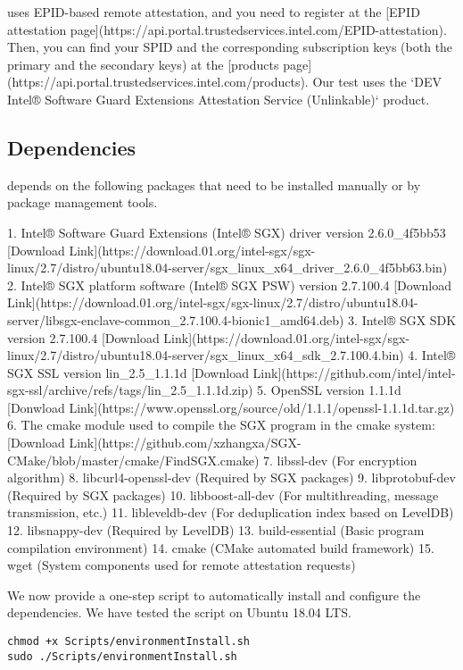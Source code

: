 \sysnameS uses EPID-based remote attestation, and you need to register at the [EPID attestation page](https://api.portal.trustedservices.intel.com/EPID-attestation). Then, you can find your SPID and the corresponding subscription keys (both the primary and the secondary keys) at the [products page](https://api.portal.trustedservices.intel.com/products). Our test uses the `DEV Intel® Software Guard Extensions Attestation Service (Unlinkable)` product.


\subsection{Dependencies}

\sysnameS depends on the following packages that  need to be installed manually or by package management tools.

1. Intel® Software Guard Extensions (Intel® SGX) driver version 2.6.0\_4f5bb53 [Download Link](https://download.01.org/intel-sgx/sgx-linux/2.7/distro/ubuntu18.04-server/sgx\_linux\_x64\_driver\_2.6.0\_4f5bb63.bin)
2. Intel® SGX platform software (Intel® SGX PSW) version 2.7.100.4 [Download Link](https://download.01.org/intel-sgx/sgx-linux/2.7/distro/ubuntu18.04-server/libsgx-enclave-common\_2.7.100.4-bionic1\_amd64.deb)
3. Intel® SGX SDK version 2.7.100.4 [Download Link](https://download.01.org/intel-sgx/sgx-linux/2.7/distro/ubuntu18.04-server/sgx\_linux\_x64\_sdk\_2.7.100.4.bin)
4. Intel® SGX SSL version lin\_2.5\_1.1.1d [Download Link](https://github.com/intel/intel-sgx-ssl/archive/refs/tags/lin\_2.5\_1.1.1d.zip)
5. OpenSSL version 1.1.1d [Donwload Link](https://www.openssl.org/source/old/1.1.1/openssl-1.1.1d.tar.gz)
6. The cmake module used to compile the SGX program in the cmake system: [Download Link](https://github.com/xzhangxa/SGX-CMake/blob/master/cmake/FindSGX.cmake)
7. libssl-dev (For \sysnameS encryption algorithm)
8. libcurl4-openssl-dev (Required by SGX packages)
9. libprotobuf-dev (Required by SGX packages)
10. libboost-all-dev (For \sysnameS multithreading, message transmission, etc.)
11. libleveldb-dev (For \sysnameS deduplication index based on LevelDB)
12. libsnappy-dev (Required by LevelDB)
13. build-essential (Basic program compilation environment)
14. cmake (CMake automated build framework)
15. wget (System components used for remote attestation requests)

We now provide a one-step script to automatically install and configure the dependencies. We have tested the script on Ubuntu 18.04 LTS.

\begin{lstlisting}[style=shell, caption={Bash环境下运行一键配置脚本}, label={lst:\sysnameS-bash-env-install}]
chmod +x Scripts/environmentInstall.sh
sudo ./Scripts/environmentInstall.sh
\end{lstlisting}

